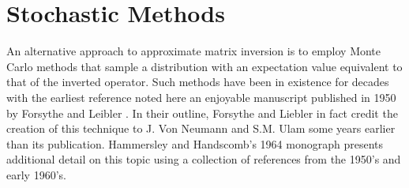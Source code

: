 \section{Stochastic Methods}
\label{sec:stochastic_methods}
An alternative approach to approximate matrix inversion is to employ
Monte Carlo methods that sample a distribution with an expectation
value equivalent to that of the inverted operator. Such methods have
been in existence for decades with the earliest reference noted here
an enjoyable manuscript published in 1950 by Forsythe and Leibler
\citep{forsythe_1950}. In their outline, Forsythe and Liebler in fact
credit the creation of this technique to J. Von Neumann and S.M. Ulam
some years earlier than its publication. Hammersley and Handscomb's
1964 monograph \citep{hammersley_1964} presents additional detail on
this topic using a collection of references from the 1950's and early
1960's.

